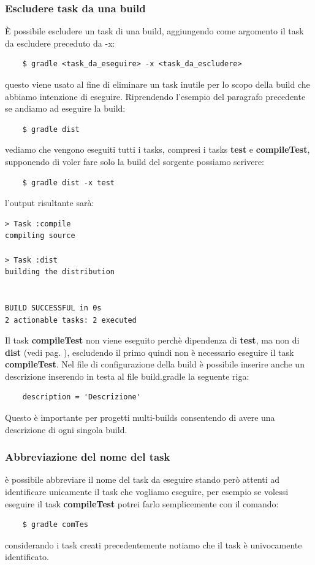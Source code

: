 \subsubsection{Escludere task da una build}
È possibile escludere un task di una build, aggiungendo come argomento il task da escludere preceduto da -x:
\begin{verbatim}
    $ gradle <task_da_eseguire> -x <task_da_escludere> \end{verbatim}
questo viene usato al fine di eliminare un task inutile per lo scopo della build che abbiamo intenzione di eseguire. Riprendendo l'esempio del paragrafo precedente se andiamo ad eseguire la build:
\begin{verbatim}
    $ gradle dist \end{verbatim}
vediamo che vengono eseguiti tutti i tasks, compresi i tasks \textbf{test} e \textbf{compileTest}, supponendo di voler fare solo la build del sorgente possiamo scrivere:
\begin{verbatim}
    $ gradle dist -x test
\end{verbatim}
l'output risultante sarà:
\begin{verbatim}
> Task :compile 
compiling source

> Task :dist 
building the distribution


BUILD SUCCESSFUL in 0s
2 actionable tasks: 2 executed \end{verbatim}
Il task \textbf{compileTest} non viene eseguito perchè dipendenza di \textbf{test}, ma non di \textbf{dist} (vedi pag. \pageref{taskdip}), escludendo il primo quindi non è necessario eseguire il task \textbf{compileTest}. Nel file di configurazione della build è possibile inserire anche un descrizione inserendo in testa al file build.gradle la seguente riga:
\begin{verbatim}
    description = 'Descrizione' \end{verbatim}
Questo è importante per progetti multi-builds consentendo di avere una descrizione di ogni singola build.

\subsubsection{Abbreviazione del nome del task} è possibile abbreviare il nome del task da eseguire stando però attenti ad identificare unicamente il task che vogliamo eseguire, per esempio se volessi eseguire il task \textbf{compileTest} potrei farlo semplicemente con il comando:
\begin{verbatim}
    $ gradle comTes \end{verbatim}
considerando i task creati precedentemente notiamo che il task è univocamente identificato.


